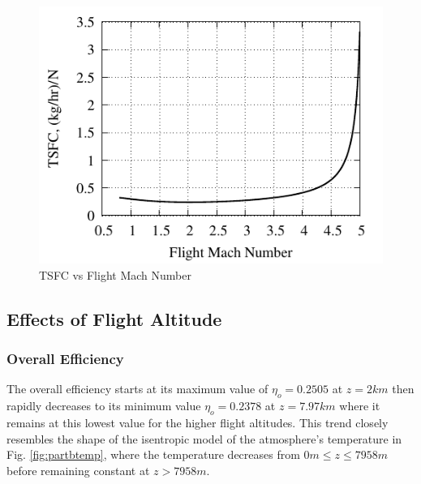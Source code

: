 \documentclass[conf]{new-aiaa} %
\begin{document}
\begin{figure}[H] %
    \centering
    \includegraphics[]{media/performance_parameter_files/part_c_TSFC.pdf}
    \caption{\label{fig:partctsfc}TSFC vs Flight Mach Number}
\end{figure}

\subsection{Effects of Flight Altitude} %
\subsubsection{Overall Efficiency}
The overall efficiency starts at its maximum value of $\eta_o=0.2505$ at $z=2km$ then rapidly decreases to its minimum value $\eta_o=0.2378$ at $z=7.97km$ where it remains at this lowest value for the higher flight altitudes. This trend closely resembles the shape of the isentropic model of the atmosphere's temperature in Fig. \ref{fig:partbtemp}, where the temperature decreases from $0m\leq z\leq7958m$ before remaining constant at $z>7958m$.
\end{document}
